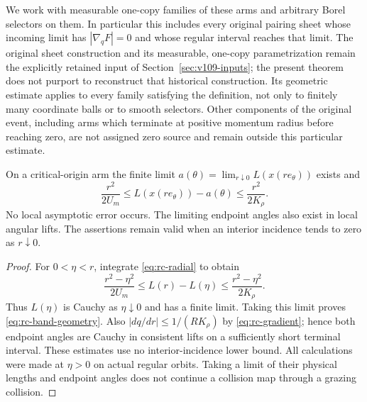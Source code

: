 We work with measurable one-copy families of these arms and arbitrary
Borel selectors on them. In particular this includes every original
pairing sheet whose incoming limit has $|\nabla_qF|=0$ and whose
regular interval reaches that limit. The original sheet construction
and its measurable, one-copy parametrization remain the explicitly
retained input of Section~\ref{sec:v109-inputs}; the present theorem
does not purport to reconstruct that historical construction. Its
geometric estimate applies to every family satisfying the definition,
not only to finitely many coordinate balls or to smooth selectors.
Other components of the original event, including arms which terminate
at positive momentum radius before reaching zero, are not assigned
zero source and remain outside this particular estimate.

\begin{lemma}
\label{lem:rc-band-geometry}
On a critical-origin arm the finite limit
$a(\theta)=\lim_{r\downarrow0}L(x(re_\theta))$ exists and
\begin{equation}\label{eq:rc-band-geometry}
 \frac{r^2}{2U_m}\le L(x(re_\theta))-a(\theta)
                      \le\frac{r^2}{2K_\rho}.
\end{equation}
No local asymptotic error occurs. The limiting endpoint angles also
exist in local angular lifts. The assertions remain valid when an
interior incidence tends to zero as $r\downarrow0$.
\end{lemma}
\begin{proof}
For $0<\eta<r$, integrate \eqref{eq:rc-radial} to obtain
\[
 \frac{r^2-\eta^2}{2U_m}\le L(r)-L(\eta)
                      \le\frac{r^2-\eta^2}{2K_\rho}.
\]
Thus $L(\eta)$ is Cauchy as $\eta\downarrow0$ and has a finite limit.
Taking this limit proves \eqref{eq:rc-band-geometry}. Also
$|dq/dr|\le1/(R K_\rho)$ by \eqref{eq:rc-gradient}; hence both
endpoint angles are Cauchy in consistent lifts on a sufficiently short
terminal interval. These estimates use no interior-incidence lower
bound. All calculations were made at $\eta>0$ on actual regular
orbits. Taking a limit of their physical lengths and endpoint angles
does not continue a collision map through a grazing collision.
\end{proof}

